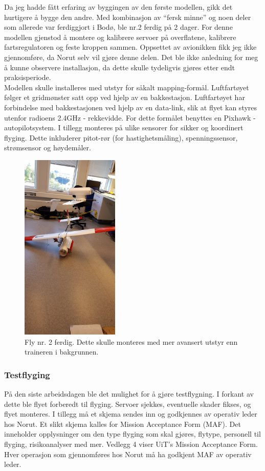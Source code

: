 \documentclass[12pt, a4paper]{article}
\begin{document}
Da jeg hadde fått erfaring av byggingen av den første modellen, gikk det hurtigere å bygge den andre. Med kombinasjon av ``fersk minne'' og noen deler som allerede var ferdiggjort i Bodø, ble nr.2 ferdig på 2 dager. For denne modellen gjenstod å montere og kalibrere servoer på overflatene, kalibrere fartsregulatoren og feste kroppen sammen. Oppsettet av avionikken fikk jeg ikke gjennomføre, da Norut selv vil gjøre denne delen. Det ble ikke anledning for meg å kunne observere installasjon, da dette skulle tydeligvis gjøres etter endt praksisperiode. \\
Modellen skulle installeres med utstyr for såkalt mapping-formål. Luftfartøyet følger et gridmønster satt opp ved hjelp av en bakkestasjon. Luftfartøyet har forbindelse med bakkestasjonen ved hjelp av en data-link, slik at flyet kan styres utenfor radioens 2.4GHz - rekkevidde. For dette formålet benyttes en Pixhawk - autopilotsystem. I tillegg monteres på ulike sensorer for sikker og koordinert flyging. Dette inkluderer pitot-rør (for hastighetsmåling), spenningssensor, strømsensor og høydemåler. 

\begin{figure}[h]
	\centering
	\includegraphics[width = .4\textwidth, height = 9cm]{bilder/andre_fly_ferdigstilt.jpg}
	\caption[Fly nummer to ferdig]{Fly nr. 2 ferdig. Dette skulle monteres med mer avansert utstyr enn traineren i bakgrunnen.}
\end{figure}

\subsubsection{Testflyging}
På den siste arbeidsdagen ble det mulighet for å gjøre testflygning. I forkant av dette ble flyet forberedt til flyging. Servoer sjekkes, eventuelle skader fikses, og flyet monteres. I tillegg må et skjema sendes inn og godkjennes av operativ leder hos Norut. Et slikt skjema kalles for Mission Acceptance Form (MAF). Det inneholder opplysninger om den type flyging som skal gjøres, flytype, personell til flyging, risikoanalyser med mer. Vedlegg 4 viser UiT's Mission Acceptance Form. Hver operasjon som gjennomføres hos Norut må ha godkjent MAF av operativ leder. \\
\end{document}
